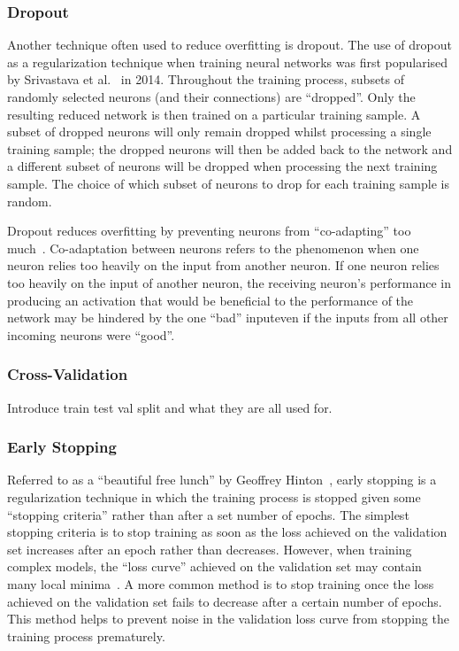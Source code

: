\subsubsection{Dropout}

Another technique often used to reduce overfitting is dropout. The use of dropout as a regularization technique when training neural networks was first popularised by Srivastava et al.~\cite{dropout} in 2014. Throughout the training process, subsets of randomly selected neurons (and their connections) are ``dropped''. Only the resulting reduced network is then trained on a particular training sample. A subset of dropped neurons will only remain dropped whilst processing a single training sample; the dropped neurons will then be added back to the network and a different subset of neurons will be dropped when processing the next training sample. The choice of which subset of neurons to drop for each training sample is random. 

Dropout reduces overfitting by preventing neurons from ``co-adapting'' too much~\cite{dropout}. Co-adaptation between neurons refers to the phenomenon when one neuron relies too heavily on the input from another neuron. If one neuron relies too heavily on the input of another neuron, the receiving neuron's performance in producing an activation that would be beneficial to the performance of the network may be hindered by the one ``bad'' input\textemdash even if the inputs from all other incoming neurons were ``good''.

\subsubsection{Cross-Validation}

Introduce train test val split and what they are all used for.

\subsubsection{Early Stopping}
Referred to as a ``beautiful free lunch'' by Geoffrey Hinton~\cite[p. 141]{earlystoppinglunch}, early stopping is a regularization technique in which the training process is stopped given some ``stopping criteria'' rather than after a set number of epochs. The simplest stopping criteria is to stop training as soon as the loss achieved on the validation set increases after an epoch rather than decreases. However, when training complex models, the ``loss curve'' achieved on the validation set may contain many local minima~\cite{earlystopping}. A more common method is to stop training once the loss achieved on the validation set fails to decrease after a certain number of epochs. This method helps to prevent noise in the validation loss curve from stopping the training process prematurely.

